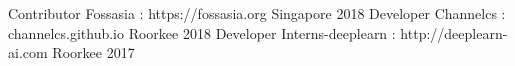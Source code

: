 \begin{cvhonors}
  \cvhonor
    {Contributor}
    {Fossasia : https://fossasia.org}
    {Singapore}
    {2018}
  \cvhonor
    {Developer}
    {Channelcs : channelcs.github.io}
    {Roorkee}
    {2018}
  \cvhonor
    {Developer}
    {Interns-deeplearn : http://deeplearn-ai.com}
    {Roorkee}
    {2017}
\end{cvhonors}

